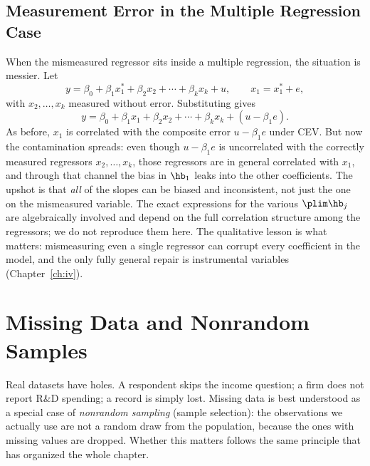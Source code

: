 
\subsection{Measurement Error in the Multiple Regression Case}

When the mismeasured regressor sits inside a multiple regression, the situation is messier. Let
\[
y = \beta_0 + \beta_1 x_1^* + \beta_2 x_2 + \cdots + \beta_k x_k + u, \qquad x_1 = x_1^* + e,
\]
with $x_2,\dots,x_k$ measured without error. Substituting gives
\[
y = \beta_0 + \beta_1 x_1 + \beta_2 x_2 + \cdots + \beta_k x_k + (u - \beta_1 e).
\]
As before, $x_1$ is correlated with the composite error $u-\beta_1 e$ under CEV. But now the contamination spreads: even though $u-\beta_1 e$ is uncorrelated with the correctly measured regressors $x_2,\dots,x_k$, those regressors are in general correlated with $x_1$, and through that channel the bias in $\hb_1$ leaks into the other coefficients. The upshot is that \emph{all} of the slopes can be biased and inconsistent, not just the one on the mismeasured variable. The exact expressions for the various $\plim\hb_j$ are algebraically involved and depend on the full correlation structure among the regressors; we do not reproduce them here. The qualitative lesson is what matters: mismeasuring even a single regressor can corrupt every coefficient in the model, and the only fully general repair is instrumental variables (Chapter~\ref{ch:iv}).

\section{Missing Data and Nonrandom Samples}

Real datasets have holes. A respondent skips the income question; a firm does not report R\&D spending; a record is simply lost. Missing data is best understood as a special case of \emph{nonrandom sampling} (sample selection): the observations we actually use are not a random draw from the population, because the ones with missing values are dropped. Whether this matters follows the same principle that has organized the whole chapter.

